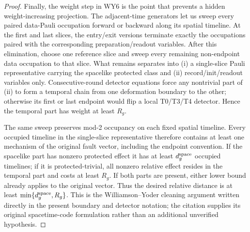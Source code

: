 \documentclass[aps,prx,reprint,superscriptaddress,nofootinbib,floatfix,longbibliography]{revtex4-2}
\theoremstyle{definition}
\begin{document}
\begin{proof}
Finally, the weight step in WY6 is the point that prevents a hidden
weight-increasing projection.  The adjacent-time generators let us sweep every
paired data-Pauli occupation forward or backward along its spatial timeline.
At the first and last slices, the entry/exit versions terminate exactly the
occupations paired with the corresponding preparation/readout variables.
After this elimination, choose one reference slice and sweep every remaining
non-endpoint data occupation to that slice.  What remains separates into (i) a
single-slice Pauli representative carrying the spacelike protected class and
(ii) record/init/readout variables only.  Consecutive-round detector equations
force any nontrivial part of (ii) to form a temporal chain from one deformation
boundary to the other; otherwise its first or last endpoint would flip a local
T0/T3/T4 detector.  Hence the temporal part has weight at least $R_g$.

The same sweep preserves mod-2 occupancy on each fixed spatial timeline.
Every occupied timeline in the single-slice representative therefore contains
at least one mechanism of the original fault vector, including the endpoint
convention.  If the spacelike part has nonzero protected effect it has at least
$d_g^{\rm space}$ occupied timelines; if it is protected-trivial, all nonzero
relative effect resides in the temporal part and costs at least $R_g$.  If both
parts are present, either lower bound already applies to the original vector.
Thus the desired relative distance is at least
$\min\{d_g^{\rm space},R_g\}$.  This is the Williamson--Yoder cleaning
argument written directly in the present boundary and detector notation; the
citation supplies its original spacetime-code formulation rather than an
additional unverified hypothesis.
\end{proof}
\end{document}
